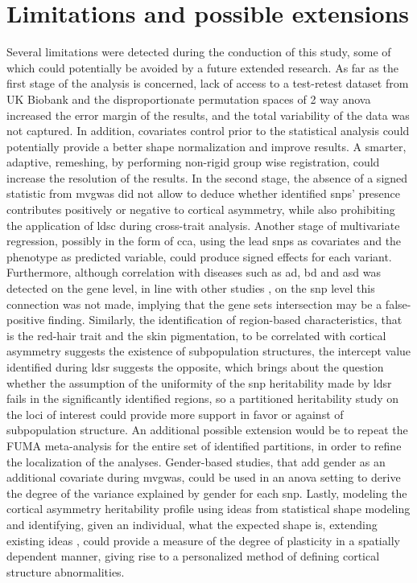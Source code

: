 \section{Limitations and possible extensions}
Several limitations were detected during the conduction of this study, some of which could potentially be avoided by a future extended research. As far as the first stage of the analysis is concerned, lack of access to a test-retest dataset from UK Biobank and the disproportionate permutation spaces of 2 way \ac{anova} increased the error margin of the results, and the total variability of the data was not captured. In addition, covariates control prior to the statistical analysis could potentially provide a better shape normalization and improve results. A smarter, adaptive, remeshing, by performing non-rigid group wise registration, could increase the resolution of the results.
In the second stage, the absence of a signed statistic from \ac{mvgwas} did not allow to deduce whether identified \acp{snp}' presence contributes positively or negative to cortical asymmetry, while also prohibiting the application of \ac{ldsc} during cross-trait analysis. Another stage of multivariate regression, possibly in the form of \ac{cca}, using the lead \acp{snp} as covariates and the phenotype as predicted variable, could produce signed effects for each variant. Furthermore, although correlation with diseases such as \ac{ad}, \ac{bd} and \ac{asd} was detected on the gene level, in line with other studies \cite{Sha2021}, on the \ac{snp} level this connection was not made, implying that the gene sets intersection may be a false-positive finding. Similarly, the identification of region-based characteristics, that is the red-hair trait and the skin pigmentation, to be correlated with cortical asymmetry suggests the existence of subpopulation structures, the intercept value identified during \ac{ldsr} suggests the opposite, which brings about the question whether the assumption of the uniformity of the \ac{snp} heritability made by \ac{ldsr} fails in the significantly identified regions, so a partitioned heritability study on the loci of interest could provide more support in favor or against of subpopulation structure.
An additional possible extension would be to repeat the FUMA meta-analysis for the entire set of identified partitions, in order to refine the localization of the analyses. Gender-based studies, that add gender as an additional covariate during  \ac{mvgwas}, could be used in an \ac{anova} setting to derive the degree of the variance explained by gender for each \ac{snp}. Lastly, modeling the cortical asymmetry heritability profile using ideas from statistical shape modeling and identifying, given an individual, what the expected shape is, extending existing ideas \cite{Filipe2019}, could provide a measure of the degree of plasticity in a spatially dependent manner, giving rise to a personalized method of defining cortical structure abnormalities.


